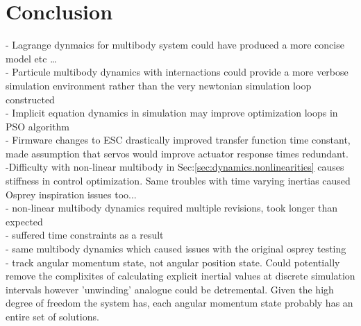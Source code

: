 \chapter{Conclusion}
\label{ch:conclusion}
- Lagrange dynmaics for multibody system could have produced a more concise model etc \ldots\\
- Particule multibody dynamics with internactions could provide a more verbose simulation environment rather than the very newtonian simulation loop constructed\\
- Implicit equation dynamics in simulation may improve optimization loops in PSO algorithm\\
- Firmware changes to ESC drastically improved transfer function time constant, made assumption that servos would improve actuator response times redundant.\\
-Difficulty with non-linear multibody in Sec:\ref{sec:dynamics.nonlinearities} causes stiffness in control optimization. Same troubles with time varying inertias caused Osprey inspiration issues too...\\
- non-linear multibody dynamics required multiple revisions, took longer than expected\\
- suffered time constraints as a result\\
- same multibody dynamics which caused issues with the original osprey testing\cite{}\\
- track angular momentum state, not angular position state. Could potentially remove the complixites of calculating explicit inertial values at discrete simulation intervals however 'unwinding' analogue could be detremental. Given the high degree of freedom the system has, each angular momentum state probably has an entire set of solutions.
